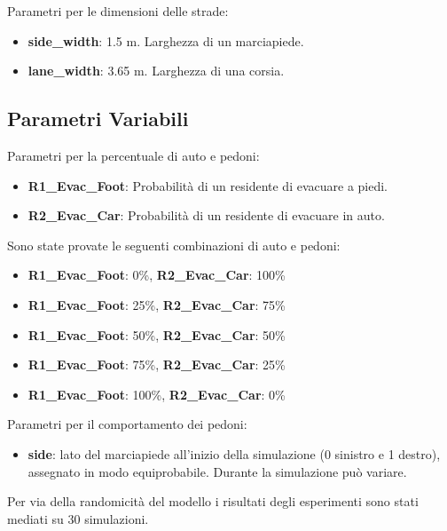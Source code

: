 \noindent
Parametri per le dimensioni delle strade:
\begin{itemize}
  \item \textbf{side\_width}: 1.5 m. Larghezza di un marciapiede.
  \item \textbf{lane\_width}: 3.65 m. Larghezza di una corsia.
\end{itemize}

\subsection{Parametri Variabili}

Parametri per la percentuale di auto e pedoni:
\begin{itemize}
  \item \textbf{R1\_Evac\_Foot}: Probabilità di un residente di evacuare a piedi.
  \item \textbf{R2\_Evac\_Car}: Probabilità di un residente di evacuare in auto.
\end{itemize}

\noindent
Sono state provate le seguenti combinazioni di auto e pedoni:
\begin{itemize}
  \item \textbf{R1\_Evac\_Foot}: 0\%, \textbf{R2\_Evac\_Car}: 100\%
  \item \textbf{R1\_Evac\_Foot}: 25\%, \textbf{R2\_Evac\_Car}: 75\%
  \item \textbf{R1\_Evac\_Foot}: 50\%, \textbf{R2\_Evac\_Car}: 50\%
  \item \textbf{R1\_Evac\_Foot}: 75\%, \textbf{R2\_Evac\_Car}: 25\%
  \item \textbf{R1\_Evac\_Foot}: 100\%, \textbf{R2\_Evac\_Car}: 0\%
\end{itemize}

\noindent
Parametri per il comportamento dei pedoni:
\begin{itemize}
  \item \textbf{side}: lato del marciapiede all'inizio della simulazione (0 sinistro e 1 destro), assegnato in modo equiprobabile. 
  Durante la simulazione può variare. 
\end{itemize}

\noindent
Per via della randomicità del modello i risultati degli esperimenti sono stati mediati su 30 simulazioni.
